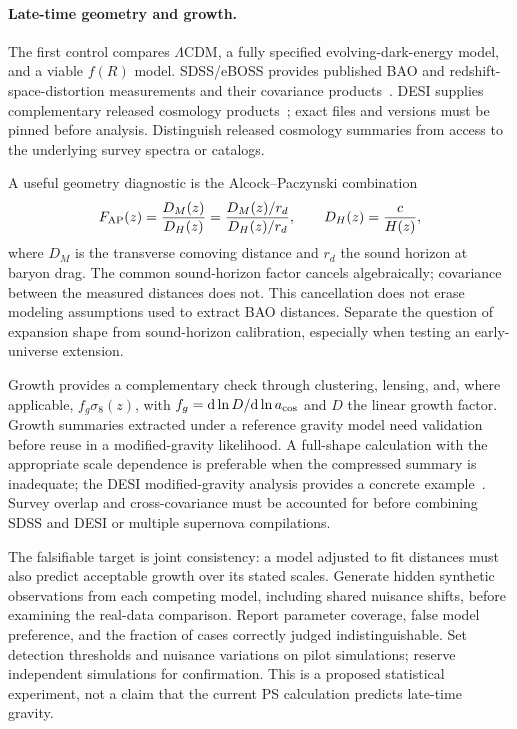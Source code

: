 \paragraph*{Late-time geometry and growth.}
The first control compares $\Lambda$CDM, a fully specified evolving-dark-energy model, and a viable $f(R)$ model.  SDSS/eBOSS provides published BAO and redshift-space-distortion measurements and their covariance products~\cite{Alam:2021}.  DESI supplies complementary released cosmology products~\cite{DESI:2025DR2}; exact files and versions must be pinned before analysis.  Distinguish released cosmology summaries from access to the underlying survey spectra or catalogs.

A useful geometry diagnostic is the Alcock--Paczynski combination
\begin{equation}
 F_{\rm AP}(z)=\frac{D_M(z)}{D_H(z)}
 =\frac{D_M(z)/r_d}{D_H(z)/r_d},\qquad D_H(z)=\frac{c}{H(z)},
 \label{eq:ap-diagnostic}
\end{equation}
where $D_M$ is the transverse comoving distance and $r_d$ the sound horizon at baryon drag.  The common sound-horizon factor cancels algebraically; covariance between the measured distances does not.  This cancellation does not erase modeling assumptions used to extract BAO distances.  Separate the question of expansion shape from sound-horizon calibration, especially when testing an early-universe extension.

Growth provides a complementary check through clustering, lensing, and, where applicable, $f_g\sigma_8(z)$, with $f_g=\dd\ln D/\dd\ln a_{\rm cos}$ and $D$ the linear growth factor.  Growth summaries extracted under a reference gravity model need validation before reuse in a modified-gravity likelihood.  A full-shape calculation with the appropriate scale dependence is preferable when the compressed summary is inadequate; the DESI modified-gravity analysis provides a concrete example~\cite{Gonzalez:2026}.  Survey overlap and cross-covariance must be accounted for before combining SDSS and DESI or multiple supernova compilations.

The falsifiable target is joint consistency: a model adjusted to fit distances must also predict acceptable growth over its stated scales.  Generate hidden synthetic observations from each competing model, including shared nuisance shifts, before examining the real-data comparison.  Report parameter coverage, false model preference, and the fraction of cases correctly judged indistinguishable.  Set detection thresholds and nuisance variations on pilot simulations; reserve independent simulations for confirmation.  This is a proposed statistical experiment, not a claim that the current PS calculation predicts late-time gravity.

